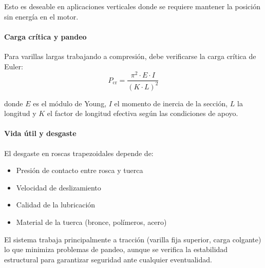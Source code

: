 Esto es deseable en aplicaciones verticales donde se requiere mantener la posición sin energía en el motor.

\paragraph{Carga crítica y pandeo}
Para varillas largas trabajando a compresión, debe verificarse la carga crítica de Euler:
\begin{equation}
    P_{\text{cr}} = \frac{\pi^2 \cdot E \cdot I}{(K \cdot L)^2}
\end{equation}

donde $E$ es el módulo de Young, $I$ el momento de inercia de la sección, $L$ la longitud y $K$ el factor de longitud efectiva según las condiciones de apoyo.

\paragraph{Vida útil y desgaste}
El desgaste en roscas trapezoidales depende de:
\begin{itemize}
    \item Presión de contacto entre rosca y tuerca
    \item Velocidad de deslizamiento
    \item Calidad de la lubricación
    \item Material de la tuerca (bronce, polímeros, acero)
\end{itemize}

El sistema trabaja principalmente a tracción (varilla fija superior, carga colgante) lo que minimiza problemas de pandeo, aunque se verifica la estabilidad estructural para garantizar seguridad ante cualquier eventualidad.
